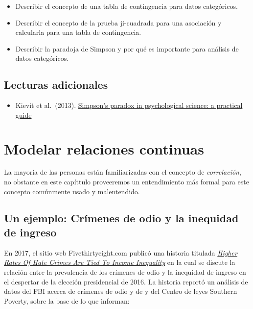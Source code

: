 \documentclass[
  12pt,
]{book}
\providecommand{\tightlist}{%
  \setlength{\itemsep}{0pt}\setlength{\parskip}{0pt}}
\begin{document}
\begin{itemize}
\tightlist
\item
  Describir el concepto de una tabla de contingencia para datos categóricos.
\item
  Describir el concepto de la prueba ji-cuadrada para una asociación y calcularla para una tabla de contingencia.
\item
  Describir la paradoja de Simpson y por qué es importante para análisis de datos categóricos.
\end{itemize}

\hypertarget{lecturas-adicionales}{%
\section{Lecturas adicionales}\label{lecturas-adicionales}}

\begin{itemize}
\tightlist
\item
  Kievit et al.~(2013). \href{https://www.frontiersin.org/articles/10.3389/fpsyg.2013.00513/full}{Simpson's paradox in psychological science: a practical guide}
\end{itemize}

\hypertarget{modeling-continuous-relationships}{%
\chapter{Modelar relaciones continuas}\label{modeling-continuous-relationships}}

La mayoría de las personas están familiarizadas con el concepto de \emph{correlación}, no obstante en este capíttulo proveeremos un entendimiento más formal para este concepto comúnmente usado y malentendido.

\hypertarget{un-ejemplo-cruxedmenes-de-odio-y-la-inequidad-de-ingreso}{%
\section{Un ejemplo: Crímenes de odio y la inequidad de ingreso}\label{un-ejemplo-cruxedmenes-de-odio-y-la-inequidad-de-ingreso}}

En 2017, el sitio web Fivethirtyeight.com publicó una historia titulada \href{https://fivethirtyeight.com/features/higher-rates-of-hate-crimes-are-tied-to-income-inequality/}{\emph{Higher Rates Of Hate Crimes Are Tied To Income Inequality}} en la cual se discute la relación entre la prevalencia de los crímenes de odio y la inequidad de ingreso en el despertar de la elección presidencial de 2016. La historia reportó un análisis de datos del FBI acerca de crímenes de odio y de y del Centro de leyes Southern Poverty, sobre la base de lo que informan:
\end{document}
